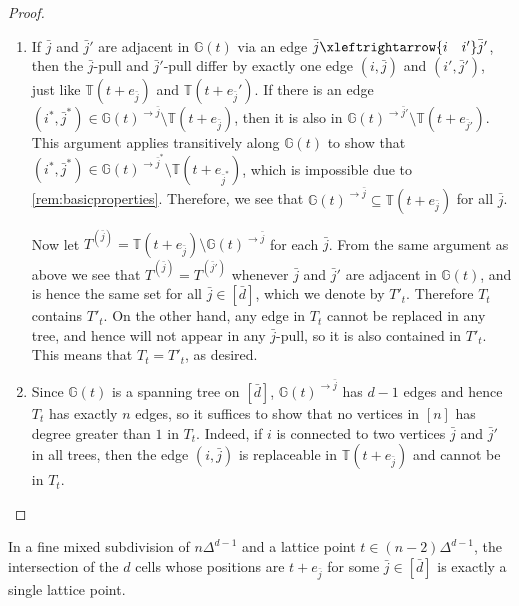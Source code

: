 \documentclass[letterpaper,reqno,11pt]{amsart}
\begin{document}
\begin{proof}
\begin{enumerate}
    \item[(a)] If $\bar{j}$ and $\bar{j}'$ are adjacent in $\mathbb{G}(t)$ via an edge $\bar{j} \xleftrightarrow{i\quad i'}\bar{j}'$, then the $\bar{j}$-pull and $\bar{j}'$-pull differ by exactly one edge $(i, \bar{j})$ and $(i', \bar{j}')$, just like $\mathbb{T}(t+e_{\bar{j}})$ and $\mathbb{T}(t+e_{\bar{j}}')$. If there is an edge $(i^*, \bar{j}^*) \in \mathbb{G}(t)^{\rightarrow\bar{j}} \setminus \mathbb{T}(t+e_{\bar{j}})$, then it is also in $\mathbb{G}(t)^{\rightarrow\bar{j}'} \setminus \mathbb{T}(t+e_{\bar{j}'})$. This argument applies transitively along $\mathbb{G}(t)$ to show that $(i^*, \bar{j}^*)\in \mathbb{G}(t)^{\rightarrow\bar{j}^*} \setminus \mathbb{T}(t+e_{\bar{j}^*})$, which is impossible due to \cref{rem:basicproperties}. Therefore, we see that $\mathbb{G}(t)^{\rightarrow\bar{j}} \subseteq \mathbb{T}(t+e_{\bar{j}})$ for all $\bar{j}$.

    Now let $T^{(\bar{j})} = \mathbb{T}(t+e_{\bar{j}}) \setminus \mathbb{G}(t)^{\rightarrow\bar{j}}$ for each $\bar{j}$. From the same argument as above we see that $T^{(\bar{j})} = T^{(\bar{j}')}$ whenever $\bar{j}$ and $\bar{j}'$ are adjacent in $\mathbb{G}(t)$, and is hence the same set for all $\bar{j}\in [\bar{d}]$, which we denote by $T'_t$. Therefore $T_t$ contains $T'_t$. On the other hand, any edge in $T_t$ cannot be replaced in any tree, and hence will not appear in any $\bar{j}$-pull, so it is also contained in $T'_t$. This means that $T_t = T'_t$, as desired.

    \item[(b)] Since $\mathbb{G}(t)$ is a spanning tree on $[\bar{d}]$, $\mathbb{G}(t)^{\rightarrow\bar{j}}$ has $d-1$ edges and hence $T_t$ has exactly $n$ edges, so it suffices to show that no vertices in $[n]$ has degree greater than $1$ in $T_t$. Indeed, if $i$ is connected to two vertices $\bar{j}$ and $\bar{j}'$ in all trees, then the edge $(i, \bar{j})$ is replaceable in $\mathbb{T}(t+e_{\bar{j}})$ and cannot be in $T_t$.

\end{enumerate}
\end{proof}

\begin{corollary}
    In a fine mixed subdivision of $n\Delta^{d-1}$ and a lattice point $t\in (n-2)\Delta^{d-1}$, the intersection of the $d$ cells whose positions are $t + e_{\bar{j}}$ for some $\bar{j}\in [\bar{d}]$ is exactly a single lattice point.
\end{corollary}
\end{document}
